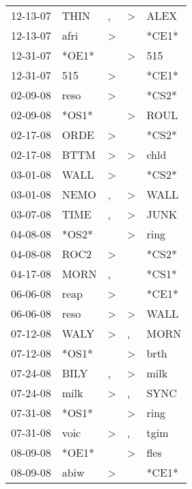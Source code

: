 \begin{supertabular}{lllll}
 12-13-07 &   THIN &                , &     \textgreater &   ALEX \\
 12-13-07 &   afri &     \textgreater &                  &  *CE1* \\
 12-31-07 &  *OE1* &                  &     \textgreater &    515 \\
 12-31-07 &    515 &     \textgreater &                  &  *CE1* \\
 02-09-08 &   reso &     \textgreater &                  &  *CS2* \\
 02-09-08 &  *OS1* &                  &     \textgreater &   ROUL \\
 02-17-08 &   ORDE &     \textgreater &                  &  *CS2* \\
 02-17-08 &   BTTM &     \textgreater &     \textgreater &   chld \\
 03-01-08 &   WALL &     \textgreater &                  &  *CS2* \\
 03-01-08 &   NEMO &                , &     \textgreater &   WALL \\
 03-07-08 &   TIME &                , &     \textgreater &   JUNK \\
 04-08-08 &  *OS2* &                  &     \textgreater &   ring \\
 04-08-08 &   ROC2 &     \textgreater &                  &  *CS2* \\
 04-17-08 &   MORN &                , &                  &  *CS1* \\
 06-06-08 &   reap &     \textgreater &                  &  *CE1* \\
 06-06-08 &   reso &     \textgreater &     \textgreater &   WALL \\
 07-12-08 &   WALY &     \textgreater &                , &   MORN \\
 07-12-08 &  *OS1* &                  &     \textgreater &   brth \\
 07-24-08 &   BILY &                , &     \textgreater &   milk \\
 07-24-08 &   milk &     \textgreater &                , &   SYNC \\
 07-31-08 &  *OS1* &                  &     \textgreater &   ring \\
 07-31-08 &   voic &     \textgreater &                , &   tgim \\
 08-09-08 &  *OE1* &                  &     \textgreater &   fles \\
 08-09-08 &   abiw &     \textgreater &                  &  *CE1* \\

\end{supertabular}
